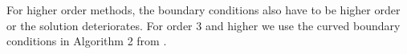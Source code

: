 



For higher order methods, the boundary conditions also have to be higher
order or the solution deteriorates. For order 3 and higher we use
the curved boundary conditions in Algorithm 2 from \cite{KB:2006}.


